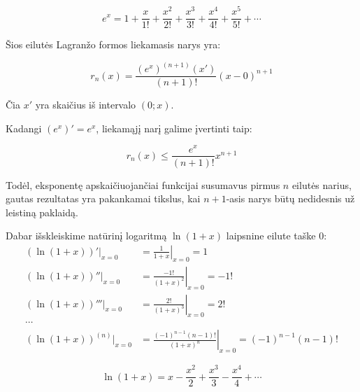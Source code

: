 \begin{equation}
  e^{x} = 1 + \frac{x}{1!} + \frac{x^2}{2!} + \frac{x^3}{3!} +%
    \frac{x^4}{4!} + \frac{x^5}{5!} + \cdots
  \label{e_1}
\end{equation}

Šios eilutės Lagranžo formos liekamasis narys yra:

\begin{equation}
  r_n (x) = \frac{(e^x)^{(n + 1)}(x')}{(n + 1)!}(x - 0)^{n + 1}
\end{equation}

Čia $x'$ yra skaičius iš intervalo $(0; x)$.

Kadangi $(e^x)' = e^x$, liekamąjį narį galime įvertinti taip:

\begin{equation}
  r_n (x) \leq \frac{e^x}{(n + 1)!}x^{n + 1}
\end{equation}

Todėl, eksponentę apskaičiuojančiai funkcijai susumavus pirmus $n$ eilutės
narius, gautas rezultatas yra pakankamai tikslus, kai $n + 1$-asis narys
būtų nedidesnis už leistiną paklaidą.

Dabar išskleiskime natūrinį logaritmą $\ln (1+x)$ laipsnine eilute 
taške $0$:
\begin{align*}
  (\ln (1 + x))'|_{x=0} &= \left. \frac{1}{1+x} \right|_{x=0} = 1 \\
  (\ln (1 + x))''|_{x=0} &= \left. \frac{-1!}{(1+x)^{2}} \right|_{x=0} %
    = -1! \\
  (\ln (1 + x))'''|_{x=0} &= \left. \frac{2!}{(1+x)^{3}} \right|_{x=0} %
    = 2! \\
  \cdots \\
  (\ln (1 + x))^{(n)}|_{x=0} &= %
    \left. \frac{(-1)^{n-1}(n-1)!}{(1+x)^{n}} \right|_{x=0} = %
    (-1)^{n-1}(n-1)!
\end{align*}

\begin{equation}
  \ln (1 + x) = x - \frac{x^2}{2} + \frac{x^3}{3} - \frac{x^4}{4} + \cdots
  \label{ln_1}
\end{equation}

